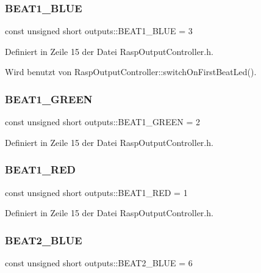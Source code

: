 \subsubsection{\texorpdfstring{B\+E\+A\+T1\+\_\+\+B\+L\+UE}{BEAT1\_BLUE}}
{\footnotesize\ttfamily const unsigned short outputs\+::\+B\+E\+A\+T1\+\_\+\+B\+L\+UE = 3}



Definiert in Zeile 15 der Datei Rasp\+Output\+Controller.\+h.



Wird benutzt von Rasp\+Output\+Controller\+::switch\+On\+First\+Beat\+Led().

\mbox{\label{namespaceoutputs_ad934b2db0cff1421ca84b300dc257508}} 
\subsubsection{\texorpdfstring{B\+E\+A\+T1\+\_\+\+G\+R\+E\+EN}{BEAT1\_GREEN}}
{\footnotesize\ttfamily const unsigned short outputs\+::\+B\+E\+A\+T1\+\_\+\+G\+R\+E\+EN = 2}



Definiert in Zeile 15 der Datei Rasp\+Output\+Controller.\+h.

\mbox{\label{namespaceoutputs_ae1c055268c6bbfadcc272bc6028b1a59}} 
\subsubsection{\texorpdfstring{B\+E\+A\+T1\+\_\+\+R\+ED}{BEAT1\_RED}}
{\footnotesize\ttfamily const unsigned short outputs\+::\+B\+E\+A\+T1\+\_\+\+R\+ED = 1}



Definiert in Zeile 15 der Datei Rasp\+Output\+Controller.\+h.

\mbox{\label{namespaceoutputs_ac6bffee9716f79b218c8fb366351032e}} 
\subsubsection{\texorpdfstring{B\+E\+A\+T2\+\_\+\+B\+L\+UE}{BEAT2\_BLUE}}
{\footnotesize\ttfamily const unsigned short outputs\+::\+B\+E\+A\+T2\+\_\+\+B\+L\+UE = 6}



